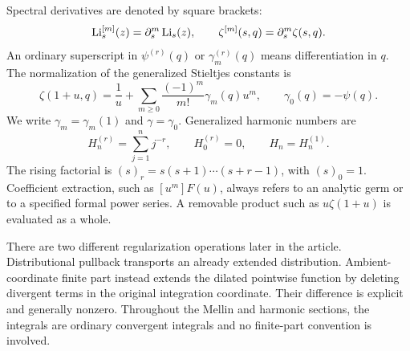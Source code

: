 Spectral derivatives are denoted by square brackets:
\[
 \operatorname{Li}_s^{[m]}(z)=\partial_s^m\operatorname{Li}_s(z),\qquad
 \zeta^{[m]}(s,q)=\partial_s^m\zeta(s,q).
\]
An ordinary superscript in $\psi^{(r)}(q)$ or $\gamma_m^{(r)}(q)$ means differentiation in $q$. The normalization of the generalized Stieltjes constants is
\begin{equation}\label{mld:eq:stieltjes-definition}
 \zeta(1+u,q)=\frac1u+
       \sum_{m\ge0}\frac{(-1)^m}{m!}\gamma_m(q)u^m,
 \qquad \gamma_0(q)=-\psi(q).
\end{equation}
We write $\gamma_m=\gamma_m(1)$ and $\gamma=\gamma_0$. Generalized harmonic numbers are
\[
 H_n^{(r)}=\sum_{j=1}^n j^{-r},\qquad H_0^{(r)}=0,
 \qquad H_n=H_n^{(1)}.
\]
The rising factorial is $(s)_r=s(s+1)\cdots(s+r-1)$, with $(s)_0=1$. Coefficient extraction, such as $[u^m]F(u)$, always refers to an analytic germ or to a specified formal power series. A removable product such as $u\zeta(1+u)$ is evaluated as a whole.

There are two different regularization operations later in the article. Distributional pullback transports an already extended distribution. Ambient-coordinate finite part instead extends the dilated pointwise function by deleting divergent terms in the original integration coordinate. Their difference is explicit and generally nonzero. Throughout the Mellin and harmonic sections, the integrals are ordinary convergent integrals and no finite-part convention is involved.
